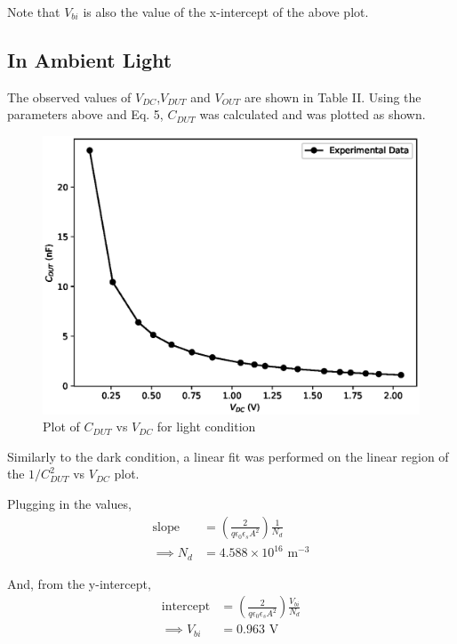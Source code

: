 Note that $V_{bi}$ is also the value of the x-intercept of the above plot.

\subsection{In Ambient Light}
The observed values of $V_{DC}$,$V_{DUT}$ and $V_{OUT}$ are shown in Table II.
Using the parameters above and Eq. 5, $C_{DUT}$ was calculated and was plotted as shown.



\begin{figure}
    \centering
    \includegraphics[width=1\columnwidth]{images/light0.eps}
    \caption{Plot of $C_{DUT}$ vs $V_{DC}$ for light condition}
\end{figure}

Similarly to the dark condition, a linear fit was performed on the linear region of the $1/C_{DUT}^2$ vs $V_{DC}$ plot.

Plugging in the values,
\begin{align*}
    \text{slope} &= \left(\frac{2}{q\epsilon_0\epsilon_sA^2}\right)\frac{1}{N_d}\\
    \implies N_d &= 4.588 \times 10^{16} \text{ m}^{-3}
\end{align*}

And, from the y-intercept,
\begin{align*}
    \text{intercept} &= \left(\frac{2}{q\epsilon_0\epsilon_sA^2}\right)\frac{V_{bi}}{N_d}\\
    \implies V_{bi} &= 0.963 \text{ V}
\end{align*}

